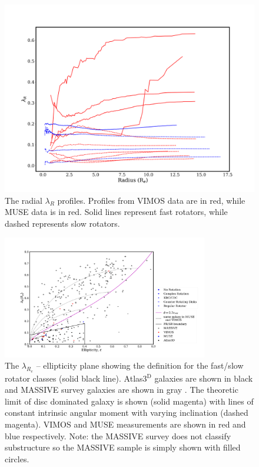 		\begin{figure}
			\centering
			\includegraphics[width=.7\textwidth]{chapter4/lambda_R.png}
			\caption[$\lambda_{R}$ radial profiles]{The radial $\lambda_{R}$ profiles. Profiles from VIMOS data are in red, while MUSE data is in red. Solid lines represent fast rotators, while dashed represents slow rotators.}
			\label{fig:lambdaR_profile}
		\end{figure}


		\begin{figure}
			\centering
			\includegraphics[width=0.8\textwidth]{chapter4/lambda_R_ellipticity.png}
			\caption[$\lambda_{R_e}$ -- ellipticity plane]{The $\lambda_{R_e}$ -- ellipticity plane showing the definition for the fast/slow rotator classes (solid black line). Atlas3$^\text{D}$ galaxies are shown in black \citep{Emsellem2011} and MASSIVE survey galaxies are shown in gray \citep{Veale2017}. The theoretic limit of disc dominated galaxy is shown (solid magenta) with lines of constant intrinsic angular moment with varying inclination (dashed magenta). VIMOS and MUSE measurements are shown in red and blue respectively. Note: the MASSIVE survey does not classify substructure so the MASSIVE sample is simply shown with filled circles.}
			\label{fig:lambdaR_ellip}
		\end{figure}


